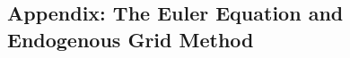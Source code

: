 \documentclass[12pt,pdftex]{article}
\renewcommand{\arraystretch}{1.1}
\begin{document}
\begin{onehalfspacing}

\newpage

\section{Appendix: The Euler Equation and Endogenous Grid Method}


\end{onehalfspacing}
\end{document}
